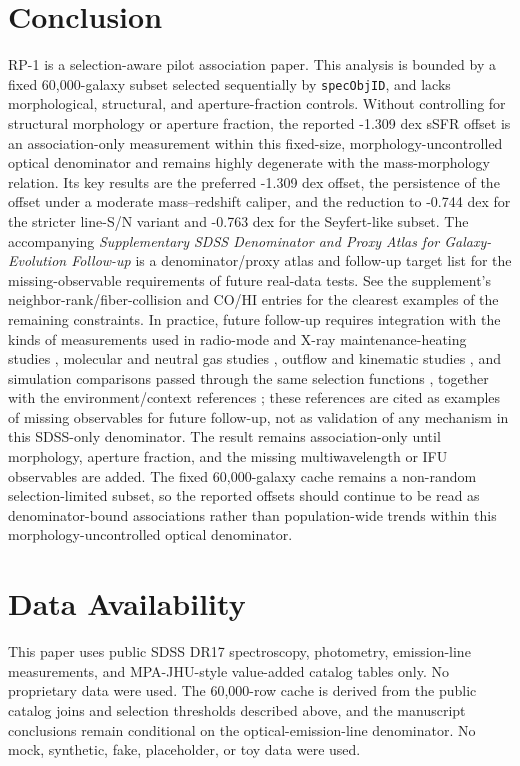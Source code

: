 \documentclass[twocolumn]{aastex631}
\begin{document}
\section{Conclusion}
RP-1 is a selection-aware pilot association paper. This analysis is bounded by a fixed 60,000-galaxy subset selected sequentially by \texttt{specObjID}, and lacks morphological, structural, and aperture-fraction controls. Without controlling for structural morphology or aperture fraction, the reported -1.309 dex sSFR offset is an association-only measurement within this fixed-size, morphology-uncontrolled optical denominator and remains highly degenerate with the mass-morphology relation. Its key results are the preferred -1.309 dex offset, the persistence of the offset under a moderate mass--redshift caliper, and the reduction to -0.744 dex for the stricter line-S/N variant and -0.763 dex for the Seyfert-like subset. The accompanying \emph{Supplementary SDSS Denominator and Proxy Atlas for Galaxy-Evolution Follow-up} is a denominator/proxy atlas and follow-up target list for the missing-observable requirements of future real-data tests. See the supplement's neighbor-rank/fiber-collision and CO/HI entries for the clearest examples of the remaining constraints.
In practice, future follow-up requires integration with the kinds of measurements used in radio-mode and X-ray maintenance-heating studies \citep{best2005,fabian2012,mcnamara2007,heckmanbest2014,lamassa2013}, molecular and neutral gas studies \citep{xcoldgass2017,xgass2018}, outflow and kinematic studies \citep{veilleux2005,cicone2014,carniani2017,fiore2017}, and simulation comparisons passed through the same selection functions \citep{simba2019,tng2019,eagle2015}, together with the environment/context references \citep{peng2010,ellison2011,piotrowska2022,wetzel2013,dekel2006}; these references are cited as examples of missing observables for future follow-up, not as validation of any mechanism in this SDSS-only denominator. The result remains association-only until morphology, aperture fraction, and the missing multiwavelength or IFU observables are added. The fixed 60,000-galaxy cache remains a non-random selection-limited subset, so the reported offsets should continue to be read as denominator-bound associations rather than population-wide trends within this morphology-uncontrolled optical denominator.

\section*{Data Availability}
This paper uses public SDSS DR17 spectroscopy, photometry, emission-line measurements, and MPA-JHU-style value-added catalog tables only. No proprietary data were used. The 60,000-row cache is derived from the public catalog joins and selection thresholds described above, and the manuscript conclusions remain conditional on the optical-emission-line denominator. No mock, synthetic, fake, placeholder, or toy data were used.
\end{document}
